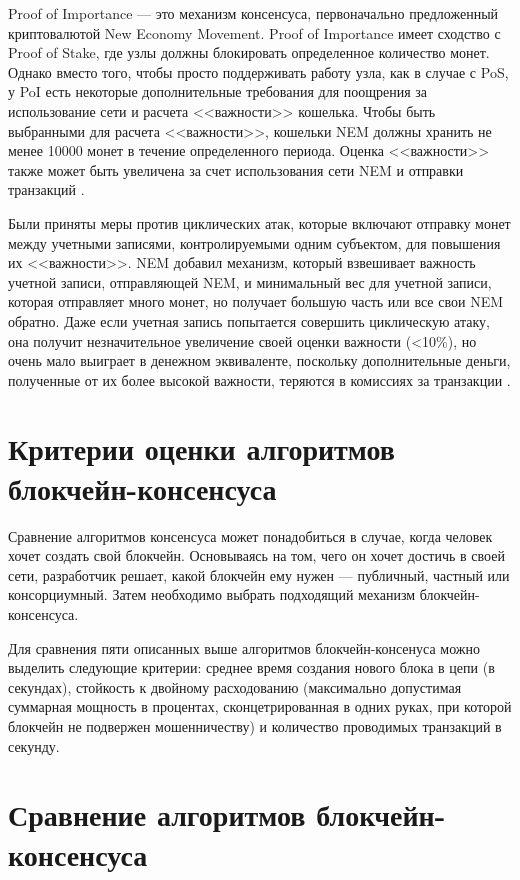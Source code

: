 Proof of Importance --- это механизм консенсуса, первоначально предложенный криптовалютой New Economy Movement. 
Proof of Importance имеет сходство с Proof of Stake, где узлы должны блокировать определенное количество монет. 
Однако вместо того, чтобы просто поддерживать работу узла, как в случае с PoS, у PoI есть некоторые дополнительные требования для поощрения за использование сети и расчета <<важности>> кошелька.  
Чтобы быть выбранными для расчета <<важности>>, кошельки NEM должны хранить не менее 10000 монет в течение определенного периода. 
Оценка <<важности>> также может быть увеличена за счет использования сети NEM и отправки транзакций \cite{Auhl2022}.

Были приняты меры против циклических атак, которые включают отправку монет между учетными записями, контролируемыми одним субъектом, для повышения их <<важности>>. 
NEM добавил механизм, который взвешивает важность учетной записи, отправляющей NEM, и минимальный вес для учетной записи, которая отправляет много монет, но получает большую часть или все свои NEM обратно. 
Даже если учетная запись попытается совершить циклическую атаку, она получит незначительное увеличение своей оценки важности (<10\%), но очень мало выиграет в денежном эквиваленте, поскольку дополнительные деньги, полученные от их более высокой важности, теряются в комиссиях за транзакции \cite{Auhl2022}. 

\section{Критерии оценки алгоритмов блокчейн-консенсуса}

Сравнение алгоритмов консенсуса может понадобиться в случае, когда человек хочет создать свой блокчейн. 
Основываясь на том, чего он хочет достичь в своей сети, разработчик решает, какой блокчейн ему нужен --- публичный, частный или консорциумный. 
Затем необходимо выбрать подходящий механизм блокчейн-консенсуса.

Для сравнения пяти описанных выше алгоритмов блокчейн-консенуса можно выделить следующие критерии: среднее время создания нового блока в цепи (в секундах), стойкость к двойному расходованию (максимально допустимая суммарная мощность в процентах, сконцетрированная в одних руках, при которой блокчейн не подвержен мошенничеству) и количество проводимых транзакций в секунду.

\section{Сравнение алгоритмов блокчейн-консенсуса}

